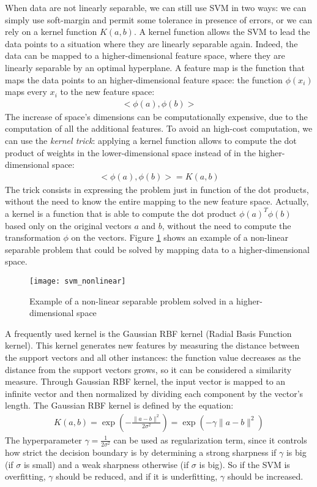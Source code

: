 When data are not linearly separable, we can still use SVM in two ways: we can simply use soft-margin and permit some tolerance in presence of errors, or we can rely on a kernel function $K(a, b)$. A kernel function allows the SVM to lead the data points to a situation where they are linearly separable again. Indeed, the data can be mapped to a higher-dimensional feature space, where they are linearly separable by an optimal hyperplane. A feature map is the function that maps the data points to an higher-dimensional feature space: the function $\phi(x_i)$ maps every $x_i$ to the new feature space:
\begin{align}
    <\phi(a), \phi(b)>
\end{align}
The increase of space's dimensions can be computationally expensive, due to the computation of all the additional features. To avoid an high-cost computation, we can use the \textit{kernel trick}: applying a kernel function allows to compute the dot product of weights in the lower-dimensional space instead of in the higher-dimensional space:
\begin{align}
    <\phi(a), \phi(b)> = K(a, b)
\end{align}
The trick consists in expressing the problem just in function of the dot products, without the need to know the entire mapping to the new feature space. Actually, a kernel is a function that is able to compute the dot product $\phi(a)^T \phi(b)$ based only on the original vectors $a$ and $b$, without the need to compute the transformation $\phi$ on the vectors. Figure \ref{fig:svm_nonlinear} shows an example of a non-linear separable problem that could be solved by mapping data to a higher-dimensional space.
\begin{figure}[htbp]
    \centering
    \texttt{[image: svm\_nonlinear]}
    \caption{Example of a non-linear separable problem solved in a higher-dimensional space}
    \label{fig:svm_nonlinear}
\end{figure}

A frequently used kernel is the Gaussian RBF kernel (Radial Basis Function kernel). This kernel generates new features by measuring the distance between the support vectors and all other instances: the function value decreases as the distance from the support vectors grows, so it can be considered a similarity measure. Through Gaussian RBF kernel, the input vector is mapped to an infinite vector and then normalized by dividing each component by the vector’s length. The Gaussian RBF kernel is defined by the equation:
\begin{align}
    K(a, b) = \exp \left(-\frac{\|a - b\|^{2}}{2 \sigma^{2}}\right) = \exp \left( -\gamma \|a - b\|^{2} \right)
\end{align}
The hyperparameter $\gamma = \frac{1}{2 \sigma^{2}}$ can be used as regularization term, since it controls how strict the decision boundary is by determining a strong sharpness if $\gamma$ is big (if $\sigma$ is small) and a weak sharpness otherwise (if $\sigma$ is big). So if the SVM is overfitting, $\gamma$ should be reduced, and if it is underfitting, $\gamma$ should be increased.

